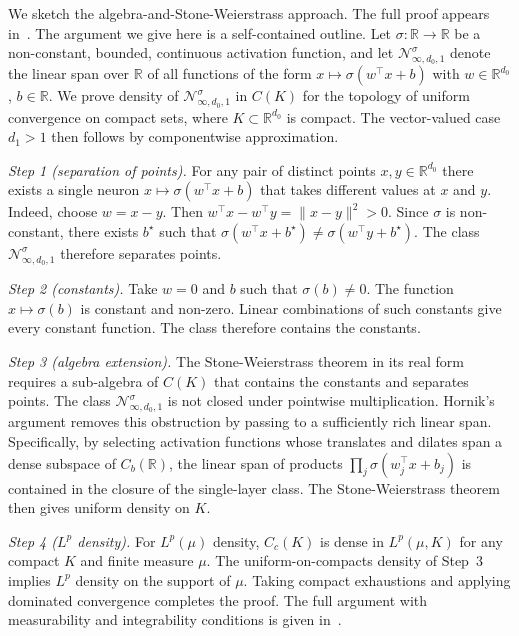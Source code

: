 \documentclass[12pt,a4paper]{article}
\theoremstyle{definition}
\theoremstyle{plain}
\theoremstyle{remark}
\theoremstyle{plain}
\begin{document}
We sketch the algebra-and-Stone-Weierstrass approach. The full
proof appears in~\cite{Hornik1991}. The argument we give here is a
self-contained outline. Let $\sigma : \mathbb{R} \to \mathbb{R}$ be a
non-constant, bounded, continuous activation function, and let
$\mathcal{N}^\sigma_{\infty,d_0,1}$ denote the linear span over
$\mathbb{R}$ of all functions of the form $x \mapsto \sigma(w^\top x +
b)$ with $w \in \mathbb{R}^{d_0}$, $b \in \mathbb{R}$. We prove density
of $\mathcal{N}^\sigma_{\infty,d_0,1}$ in $C(K)$ for the topology of
uniform convergence on compact sets, where $K \subset \mathbb{R}^{d_0}$
is compact. The vector-valued case $d_1 > 1$ then follows by
componentwise approximation.

\textit{Step 1 (separation of points).} For any pair of distinct points
$x, y \in \mathbb{R}^{d_0}$ there exists a single neuron
$x \mapsto \sigma(w^\top x + b)$ that takes different values at $x$
and $y$. Indeed, choose $w = x - y$. Then
$w^\top x - w^\top y = \|x - y\|^2 > 0$. Since $\sigma$ is non-constant,
there exists $b^\star$ such that $\sigma(w^\top x + b^\star) \neq
\sigma(w^\top y + b^\star)$. The class
$\mathcal{N}^\sigma_{\infty,d_0,1}$ therefore separates points.

\textit{Step 2 (constants).} Take $w = 0$ and $b$ such that $\sigma(b)
\neq 0$. The function $x \mapsto \sigma(b)$ is constant and non-zero.
Linear combinations of such constants give every constant function.
The class therefore contains the constants.

\textit{Step 3 (algebra extension).} The Stone-Weierstrass theorem in
its real form requires a sub-algebra of $C(K)$ that contains the
constants and separates points. The class
$\mathcal{N}^\sigma_{\infty,d_0,1}$ is not closed under pointwise
multiplication. Hornik's argument removes this obstruction by passing
to a sufficiently rich linear span. Specifically, by selecting
activation functions whose translates and dilates span a dense subspace
of $C_b(\mathbb{R})$, the linear span of products
$\prod_{j} \sigma(w_j^\top x + b_j)$ is contained in the closure of the
single-layer class. The Stone-Weierstrass theorem then gives uniform
density on $K$.

\textit{Step 4 ($L^p$ density).} For $L^p(\mu)$ density, $C_c(K)$ is
dense in $L^p(\mu, K)$ for any compact $K$ and finite measure $\mu$.
The uniform-on-compacts density of Step~3 implies $L^p$ density on the
support of $\mu$. Taking compact exhaustions and applying dominated
convergence completes the proof. The full argument with measurability
and integrability conditions is given in~\cite{Hornik1991}.
\end{document}
